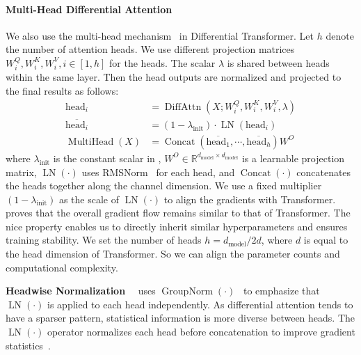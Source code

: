 \documentclass{article}
\newcommand{\mypara}[1]{\textbf{#1}~~}
\newcommand\our{Differential Transformer}
\newcommand\ourattn{differential attention}
\begin{document}
\paragraph{Multi-Head Differential Attention}
We also use the multi-head mechanism~\citep{transformer} in \our{}.
Let $h$ denote the number of attention heads. We use different projection matrices $W_i^Q, W_i^K, W_i^V, i \in [1, h]$ for the heads.
The scalar $\lambda$ is shared between heads within the same layer.
Then the head outputs are normalized and projected to the final results as follows:
\begin{equation}
\begin{aligned}
\label{eq:multihead}
\mathrm{head}_i &= \operatorname{DiffAttn}(X; W_i^Q, W_i^K, W_i^V, \lambda) \\
\overline{{\mathrm{head}_i}} &= (1 - \lambda_{\text{init}}) \cdot \operatorname{LN}( \mathrm{head}_i ) \\
\operatorname{MultiHead}(X) &= \operatorname{Concat}( \overline{{\mathrm{head}_1}}, \cdots, \overline{{\mathrm{head}_h}} ) W^O
\end{aligned}
\end{equation}
where $\lambda_{\text{init}}$ is the constant scalar in , $W^O \in \mathbb{R}^{d_{\text{model}} \times d_{\text{model}}}$ is a learnable projection matrix, $\operatorname{LN}(\cdot)$ uses RMSNorm~\citep{rmsnorm} for each head, and $\operatorname{Concat}(\cdot)$ concatenates the heads together along the channel dimension.
We use a fixed multiplier $(1 - \lambda_{\text{init}})$ as the scale of $\operatorname{LN}(\cdot)$ to align the gradients with Transformer.
 proves that the overall gradient flow remains similar to that of Transformer. The nice property enables us to directly inherit similar hyperparameters and ensures training stability.
We set the number of heads $h = d_\text{model} / 2d$, where $d$ is equal to the head dimension of Transformer. So we can align the parameter counts and computational complexity.

\mypara{Headwise Normalization}
 uses $\operatorname{GroupNorm}(\cdot)$~\citep{groupnorm} to emphasize that $\operatorname{LN}(\cdot)$ is applied to each head independently.
As \ourattn{} tends to have a sparser pattern, statistical information is more diverse between heads.
The $\operatorname{LN}(\cdot)$ operator normalizes each head before concatenation to improve gradient statistics~\citep{magneto,lineardevil}.
\end{document}
